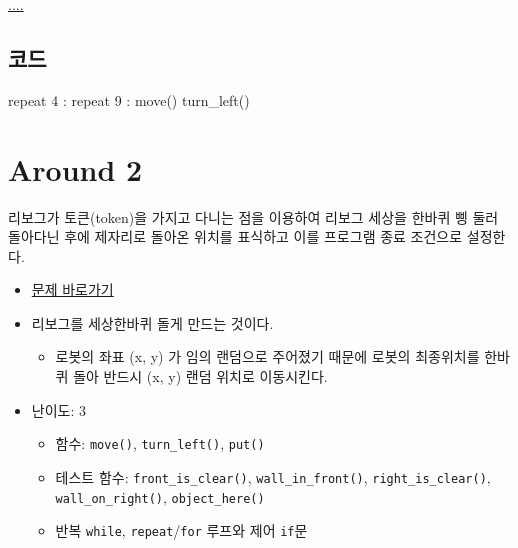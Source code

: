 \documentclass[
  b5paperpaper,
  DIV=11,
  numbers=noendperiod]{scrreprt}
\newenvironment{Shaded}{\begin{snugshade}}{\end{snugshade}}
\newcommand{\DecValTok}[1]{\textcolor[rgb]{0.68,0.00,0.00}{#1}}
\newcommand{\NormalTok}[1]{\textcolor[rgb]{0.00,0.23,0.31}{#1}}
\providecommand{\tightlist}{%
  \setlength{\itemsep}{0pt}\setlength{\parskip}{0pt}}\usepackage{longtable,booktabs,array}
\begin{document}
\url{....}

\hypertarget{uxcf54uxb4dc-5}{%
\subsection{코드}\label{uxcf54uxb4dc-5}}

\begin{Shaded}
\begin{Highlighting}[]
\NormalTok{repeat }\DecValTok{4}\NormalTok{ :}
\NormalTok{    repeat }\DecValTok{9}\NormalTok{ :}
\NormalTok{        move()}
\NormalTok{    turn\_left()}
\end{Highlighting}
\end{Shaded}

\hypertarget{around-02}{%
\section{Around 2}\label{around-02}}

리보그가 토큰(token)을 가지고 다니는 점을 이용하여 리보그 세상을 한바퀴
삥 둘러 돌아다닌 후에 제자리로 돌아온 위치를 표식하고 이를 프로그램 종료
조건으로 설정한다.

\begin{itemize}
\tightlist
\item
  \href{https://reeborg.ca/reeborg.html?lang=ko-en\&mode=python\&menu=worlds\%2Fmenus\%2Freeborg_intro_en.json\&name=Around\%202\&url=worlds\%2Ftutorial_en\%2Faround2.json}{문제
  바로가기}
\item
  리보그를 세상한바퀴 돌게 만드는 것이다.

  \begin{itemize}
  \tightlist
  \item
    로봇의 좌표 (x, y) 가 임의 랜덤으로 주어졌기 때문에 로봇의
    최종위치를 한바퀴 돌아 반드시 (x, y) 랜덤 위치로 이동시킨다.
  \end{itemize}
\item
  난이도: 3

  \begin{itemize}
  \tightlist
  \item
    함수: \texttt{move()}, \texttt{turn\_left()}, \texttt{put()}
  \item
    테스트 함수: \texttt{front\_is\_clear()},
    \texttt{wall\_in\_front()}, \texttt{right\_is\_clear()},
    \texttt{wall\_on\_right()}, \texttt{object\_here()}
  \item
    반복 \texttt{while}, \texttt{repeat}/\texttt{for} 루프와 제어
    \texttt{if}문
  \end{itemize}
\end{itemize}
\end{document}
